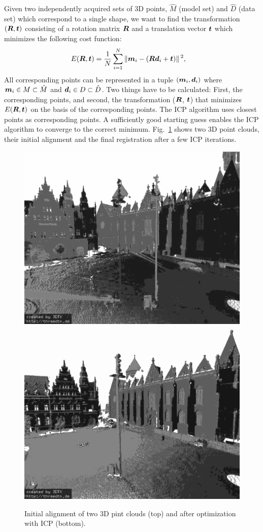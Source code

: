 \documentclass[twocolumn,oneside]{book}
\newcommand{\V}[1]{\vector{#1}}  %
\newcommand{\M}[1]{\V{#1}}    %
\begin{document}
Given two independently acquired sets of 3D points, $\hat M$ (model
set) and $\hat D$ (data set) which correspond to a single shape, we
want to find the transformation $(\M R, \V t)$ consisting of a
rotation matrix $\M R$ and a translation vector $\V t$ which minimizes
the following cost function:
\begin{align}
E(\M R, \V t) & = \frac{1}{N} \sum_{i=1}^N \norm{\V m_i - (\M R \V d_i
 + \V t)}^2, \label{DMin}
\end{align}
All corresponding points can be represented in a tuple $(\V m_i,\V
d_i)$ where $\V m_i \in M \subset \hat M$ and $\V d_i \in D \subset
\hat D$. Two things have to be calculated: First, the corresponding
points, and second, the transformation ($\M R$, $\V t$) that minimizes
$E(\M R, \V t)$ on the basis of the corresponding points. The ICP
algorithm uses closest points as corresponding points. A sufficiently
good starting guess enables the ICP algorithm to converge to the
correct minimum. Fig.~\ref{fig:icp} shows two 3D point clouds, their
initial alignment and the final registration after a few ICP
iterations.
\begin{figure}
  \centering
\includegraphics[width=0.75\linewidth]{BOOKFIGS/start_1}\\
\includegraphics[width=0.75\linewidth]{BOOKFIGS/final_1}
\caption{Initial alignment of two 3D pint clouds (top) and after
  optimization with ICP (bottom).}\label{fig:icp}
\end{figure}  
\end{document}

